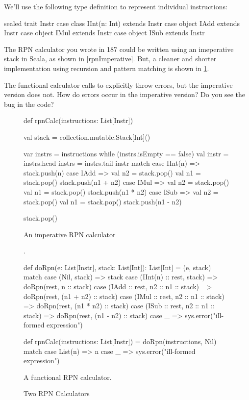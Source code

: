 \documentclass{book}
\begin{document}
We'll use the following type definition to represent individual instructions:
%
\begin{scalacode}
sealed trait Instr
case class IInt(n: Int) extends Instr
case object IAdd extends Instr
case object IMul extends Instr
case object ISub extends Instr
\end{scalacode}


The RPN calculator you wrote in 187 could be written using an imeperative stack
in Scala, as shown in \cref{rpnImperative}. But, a cleaner and shorter
implementation using recursion and pattern matching is shown in \cref{rpnCalc}.

\begin{think}
The functional calculator calls  to explicitly throw
errors, but the imperative version does not. How do errors occur in the
imperative version? Do you see the bug in the code?
\end{think}

\begin{figure}
\begin{minipage}{0.45\textwidth}
\begin{scalacode}
def rpnCalc(instructions: List[Instr]) {
  val stack = collection.mutable.Stack[Int]()

  var instrs = instructions
  while (instrs.isEmpty == false) {
    val instr = instrs.head
    instrs = instrs.tail
    instr match {
      case IInt(n) => stack.push(n)
      case IAdd => {
        val n2 = stack.pop()
        val n1 = stack.pop()
        stack.push(n1 + n2)
      }
      case IMul => {
        val n2 = stack.pop()
        val n1 = stack.pop()
        stack.push(n1 * n2)
      }
      case ISub => {
        val n2 = stack.pop()
        val n1 = stack.pop()
        stack.push(n1 - n2)
      }
    }
  }

  stack.pop()
}
\end{scalacode}
\caption{An imperative RPN calculator}.
\end{minipage}
\quad
\vrule
\quad
\begin{minipage}{0.45\textwidth}
\begin{scalacode}
def doRpn(e: List[Instr], stack: List[Int]): List[Int] =
  (e, stack) match {
    case (Nil, stack) => stack
    case (IInt(n) :: rest, stack) => doRpn(rest, n :: stack)
    case (IAdd :: rest, n2 :: n1 :: stack) =>
      doRpn(rest, (n1 + n2) :: stack)
    case (IMul :: rest, n2 :: n1 :: stack) =>
      doRpn(rest, (n1 * n2) :: stack)
    case (ISub :: rest, n2 :: n1 :: stack) =>
      doRpn(rest, (n1 - n2) :: stack)
    case _ => sys.error("ill-formed expression")
  }

def rpnCalc(instructions: List[Instr]) =
  doRpn(instructions, Nil) match {
    case List(n) => n
    case _ => sys.error("ill-formed expression")
  }
\end{scalacode}
\caption{A functional RPN calculator.}
\label{rpnCalc}
\end{minipage}
\caption{Two RPN Calculators}
\end{figure}
\end{document}
